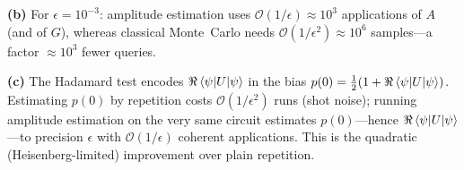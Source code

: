 \documentclass[11pt]{article}
\newcommand{\bigo}{\mathcal{O}}
\begin{document}
\textbf{(b)} For $\epsilon=10^{-3}$: amplitude estimation uses
$\bigo(1/\epsilon)\approx10^{3}$ applications of $A$ (and of $G$), whereas classical
Monte~Carlo needs $\bigo(1/\epsilon^2)\approx10^{6}$ samples---a factor $\approx10^3$
fewer queries.

\textbf{(c)} The Hadamard test encodes $\Re\braket{\psi|U|\psi}$ in the bias
$p(0)=\tfrac12(1+\Re\braket{\psi|U|\psi})$. Estimating $p(0)$ by repetition costs
$\bigo(1/\epsilon^2)$ runs (shot noise); running amplitude estimation on the very same
circuit estimates $p(0)$---hence $\Re\braket{\psi|U|\psi}$---to precision $\epsilon$
with $\bigo(1/\epsilon)$ coherent applications. This is the quadratic
(Heisenberg-limited) improvement over plain repetition.
\end{document}
